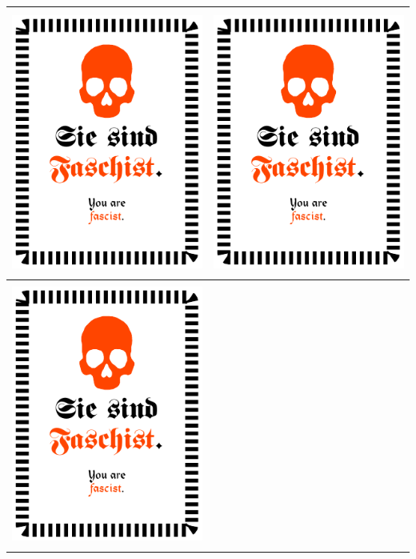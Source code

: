 \documentclass[12pt,a4paper,spanish]{article}
\begin{document}
	\begin{table}
		\centering
		\begin{tabular}{|c|c|}
			\toprule
			\includegraphics[height=8.7cm, angle=90]{./Drawings/role_fascist.pdf} &
			\includegraphics[height=8.7cm, angle=90]{./Drawings/role_fascist.pdf} \\
			\midrule
			\includegraphics[height=8.7cm, angle=90]{./Drawings/role_fascist.pdf} &

\end{tabular}
\end{table}
\end{document}
